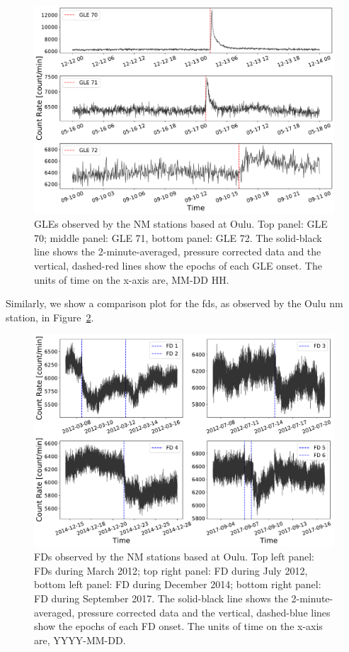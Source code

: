 \begin{figure}[ht!]
	\centering
	\includegraphics[width=0.75\columnwidth]{GLEs_OULU.pdf}
	\caption{GLEs observed by the NM stations based at Oulu. Top panel: GLE 70; middle panel: GLE 71, bottom panel: GLE 72. The solid-black line shows the 2-minute-averaged, pressure corrected data and the vertical, dashed-red lines show the epochs of each GLE onset. The units of time on the x-axis are, MM-DD HH.}
	\label{fig:oulu_gles}
\end{figure}

Similarly, we show a comparison plot for the \glspl{fd}, as observed by the Oulu \gls{nm} station, in Figure~\ref{fig:oulu_fds}.

\begin{figure}[ht!]
	\centering
	\includegraphics[width=0.75\columnwidth]{FDs_OULU.pdf}
	\caption{FDs observed by the NM stations based at Oulu. Top left panel: FDs during March 2012; top right panel: FD during July 2012, bottom left panel: FD during December 2014; bottom right panel: FD during September 2017. The solid-black line shows the 2-minute-averaged, pressure corrected data and the vertical, dashed-blue lines show the epochs of each FD onset. The units of time on the x-axis are, YYYY-MM-DD.}
	\label{fig:oulu_fds}
\end{figure}

